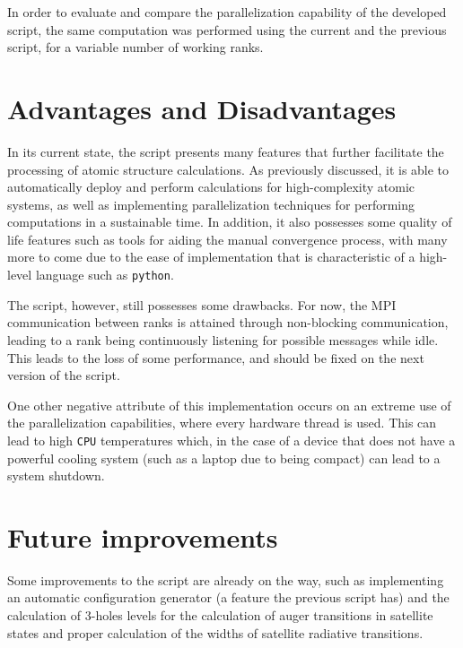 In order to evaluate and compare the parallelization capability of the developed script, the same computation was performed using the current and the previous script, for a variable number of working ranks.


\section{Advantages and Disadvantages}

In its current state, the script presents many features that further facilitate the processing of atomic structure calculations. As previously discussed, it is able to automatically deploy and perform calculations for high-complexity atomic systems, as well as implementing parallelization techniques for performing computations in a sustainable time. In addition, it also possesses some quality of life features such as tools for aiding the manual convergence process, with many more to come due to the ease of implementation that is characteristic of a high-level language such as \verb|python|.

The script, however, still possesses some drawbacks.
For now, the \gls{MPI} communication between ranks is attained through non-blocking communication, leading to a rank being continuously listening for possible messages while idle. This leads to the loss of some performance, and should be fixed on the next version of the script.

One other negative attribute of this implementation occurs on an extreme use of the parallelization capabilities, where every hardware thread is used. This can lead to high \verb|CPU| temperatures which, in the case of a device that does not have a powerful cooling system (such as a laptop due to being compact) can lead to a system shutdown.


\section{Future improvements}

Some improvements to the script are already on the way, such as implementing an automatic configuration generator (a feature the previous script has) and the calculation of 3-holes levels for the calculation of auger transitions in satellite states and proper calculation of the widths of satellite radiative transitions.
